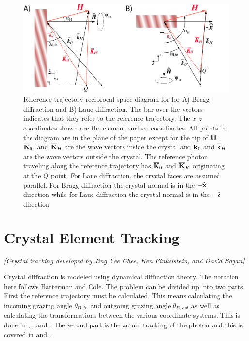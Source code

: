 \begin{figure}[tb]
  \centering
  \includegraphics[width=5in]{crystal-diffraction.pdf}
  \caption[Reference trajectory reciprocal space diagram for crystal diffraction.]
{Reference trajectory reciprocal space diagram for for A) Bragg
diffraction and B) Laue diffraction. The bar over the vectors
indicates that they refer to the reference trajectory. The $x$-$z$
coordinates shown are the element surface coordinates. All points in the
diagram are in the plane of the paper except for the tip of ${\bf H}$.
$\overline{{\bf K}}_{0}$, and $\overline{{\bf K}}_{H}$ are the wave vectors inside the
crystal and $\overline{{\bf k}}_{0}$ and $\overline{{\bf k}}_{H}$ are the wave vectors
outside the crystal. The reference photon traveling along the
reference trajectory has $\overline{{\bf K}}_0$ and $\overline{{\bf K}}_H$ originating at
the $Q$ point. For Laue diffraction, the crystal faces are assumed
parallel.  For Bragg diffraction the crystal normal is in the $-{\widehat{\bf x}}$ direction while for Laue diffraction the crystal normal is in the
$-{\widehat{\bf z}}$ direction
  }
  \label{f:crystal.diffraction}
\end{figure}

\section{Crystal Element Tracking}
\label{s:crystal.tracking}

\textit{\large [Crystal tracking developed by Jing Yee Chee, Ken Finkelstein, and David Sagan]}

Crystal diffraction is modeled using dynamical diffraction theory. The
notation here follows Batterman and Cole\cite{b:batterman}.  The
problem can be divided up into two parts. First the reference
trajectory must be calculated. This means calculating the incoming
grazing angle $\theta_{B,in}$ and outgoing grazing angle
$\theta_{B,out}$ as well as calculating the transformations between
the various coordinate systems. This is done in ,
, and .  The second part
is the actual tracking of the photon and this is covered in
  and .

